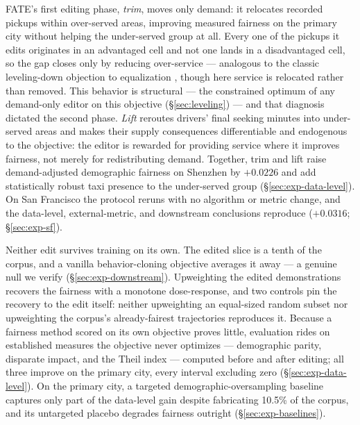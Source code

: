 FATE's first editing phase, \emph{trim}, moves only demand: it relocates
recorded pickups within over-served areas, improving measured fairness on the
primary city without helping the under-served group at all. Every one of the 
pickups it edits originates in an advantaged cell and not one lands in
a disadvantaged cell, so the gap closes only by reducing over-service ---
analogous to the classic leveling-down objection to equalization
\cite{parfit1997,mittelstadt2024}, though here service is relocated rather
than removed.
This behavior is structural --- the constrained optimum of any demand-only
editor on this objective (\S\ref{sec:leveling}) --- and that diagnosis
dictated the second phase. \emph{Lift} reroutes drivers' final seeking
minutes into under-served areas and makes their supply consequences
differentiable and endogenous to the objective: the editor is rewarded for
providing service where it improves fairness, not merely for redistributing
demand. Together, trim and lift raise demand-adjusted demographic fairness on
Shenzhen by $+0.0226$
and add statistically robust taxi presence to the under-served group
(\S\ref{sec:exp-data-level}).
On San Francisco the protocol reruns with no algorithm or metric 
change, and the data-level, external-metric, and downstream
conclusions reproduce ($+0.0316$; \S\ref{sec:exp-sf}).

Neither edit survives training on its own. The edited slice is a tenth of
the corpus, and a vanilla behavior-cloning objective averages it away ---
a genuine null we verify (\S\ref{sec:exp-downstream}). Upweighting the edited
demonstrations recovers the fairness with a monotone dose-response, and
two controls pin the recovery to the edit itself: neither upweighting an
equal-sized random subset nor upweighting the corpus's already-fairest
trajectories reproduces it. Because a fairness method scored on its own
objective proves little, evaluation rides on established measures the
objective never optimizes --- demographic parity, disparate impact, and the
Theil index --- computed before and after editing; all three improve on the
primary city, every interval excluding zero (\S\ref{sec:exp-data-level}).
On the primary city, a targeted demographic-oversampling baseline captures
only part of the data-level gain despite fabricating 10.5\% of the corpus,
and its untargeted placebo degrades fairness outright
(\S\ref{sec:exp-baselines}).


